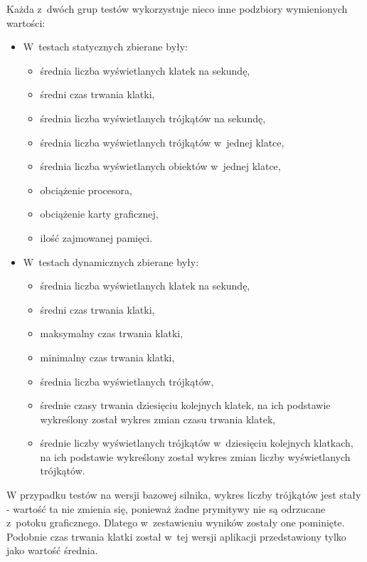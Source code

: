 \documentclass[a4paper,twoside,12pt]{book}
\begin{document}
Każda z~dwóch grup testów wykorzystuje nieco inne podzbiory wymienionych wartości:
\begin{itemize}
    \item W~testach statycznych zbierane były:
    \begin{itemize}
        \item średnia liczba wyświetlanych klatek na sekundę,
        \item średni czas trwania klatki,
        \item średnia liczba wyświetlanych trójkątów na sekundę,
        \item średnia liczba wyświetlanych trójkątów w~jednej klatce,
        \item średnia liczba wyświetlanych obiektów w~jednej klatce,
        \item obciążenie procesora,
        \item obciążenie karty graficznej,
        \item ilość zajmowanej pamięci.
    \end{itemize}
    \item W~testach dynamicznych zbierane były:
    \begin{itemize}
        \item średnia liczba wyświetlanych klatek na sekundę,
        \item średni czas trwania klatki,
        \item maksymalny czas trwania klatki,
        \item minimalny czas trwania klatki,
        \item średnia liczba wyświetlanych trójkątów,
        \item średnie czasy trwania dziesięciu kolejnych klatek, na ich podstawie wykreślony został wykres zmian czasu trwania klatek,
        \item średnie liczby wyświetlanych trójkątów w~dziesięciu kolejnych klatkach, na ich podstawie wykreślony został wykres zmian liczby wyświetlanych trójkątów.
    \end{itemize}
\end{itemize}

\vbox{}

W przypadku testów na wersji bazowej silnika, wykres liczby trójkątów jest stały - wartość ta nie zmienia się, ponieważ żadne prymitywy nie są odrzucane z~potoku graficznego. Dlatego w~zestawieniu wyników zostały one pominięte. Podobnie czas trwania klatki został w~tej wersji aplikacji przedstawiony tylko jako wartość średnia.
\end{document}
